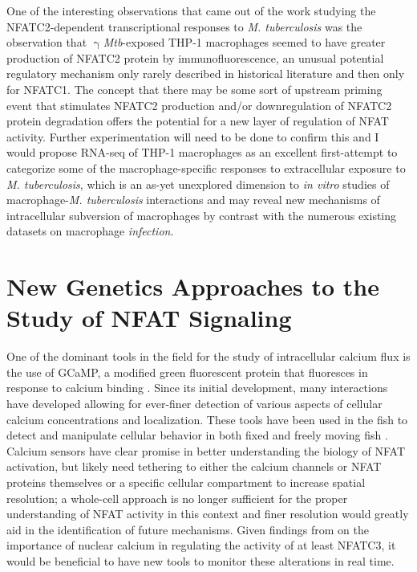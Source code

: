 One of the interesting observations that came out of the work studying the NFATC2\hyp{}dependent transcriptional responses to \textit{M. tuberculosis} was the observation that $\upgamma$\textit{Mtb}\hyp{}exposed THP\hyp{}1 macrophages seemed to have greater production of NFATC2 protein by immunofluorescence, an unusual potential regulatory mechanism only rarely described in historical literature \citep{Asagiri2005, Aramburu1995} and then only for NFATC1. The concept that there may be some sort of upstream priming event that stimulates NFATC2 production and/or downregulation of NFATC2 protein degradation offers the potential for a new layer of regulation of NFAT activity. Further experimentation will need to be done to confirm this and I would propose RNA\hyp{}seq of THP\hyp{}1 macrophages as an excellent first\hyp{}attempt to categorize some of the macrophage\hyp{}specific responses to extracellular exposure to \textit{M. tuberculosis}, which is an as\hyp{}yet unexplored dimension to \textit{in vitro} studies of macrophage\hyp{}\textit{M. tuberculosis} interactions and may reveal new mechanisms of intracellular subversion of macrophages by contrast with the numerous existing datasets on macrophage \textit{infection}.

\section{New Genetics Approaches to the Study of NFAT Signaling}\label{nfatgenetics}

One of the dominant tools in the field for the study of intracellular calcium flux is the use of GCaMP, a modified green fluorescent protein that fluoresces in response to calcium binding \citep{Nakai2001}. Since its initial development, many interactions have developed allowing for ever\hyp{}finer detection of various aspects of cellular calcium concentrations and localization. These tools have been used in the fish to detect and manipulate cellular behavior in both fixed and freely moving fish \citep{Beerman2015, Kim2017}. Calcium sensors have clear promise in better understanding the biology of NFAT activation, but likely need tethering to either the calcium channels or NFAT proteins themselves or a specific cellular compartment to increase spatial resolution; a whole\hyp{}cell approach is no longer sufficient for the proper understanding of NFAT activity in this context and finer resolution would greatly aid in the identification of future mechanisms. Given findings from \citet{Kar2015} on the importance of nuclear calcium in regulating the activity of at least NFATC3, it would be beneficial to have new tools to monitor these alterations in real time. 

